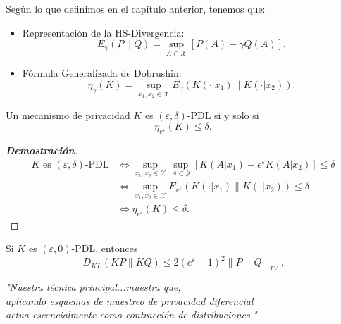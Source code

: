 \begin{observation}\cite{asoodeh2020contraction} Seg\'un lo que definimos en el cap\'itulo anterior, tenemos que:
\begin{itemize}
    \item Representaci\'on de la HS-Divergencia:
    \begin{equation*}
        E_\gamma(P\|Q)=\sup_{A\subset\mathcal{X}}[P(A)-\gamma Q(A)].
    \end{equation*}
    \item F\'ormula Generalizada de Dobrushin:
    \begin{equation*}
        \eta_\gamma(K)=\sup_{x_1,x_2\in\mathcal{X}}E_\gamma(K(\cdot|x_1)\|K(\cdot|x_2)).
    \end{equation*}
\end{itemize}
\end{observation}

\begin{theorem}\cite{asoodeh2020contraction}
Un mecanismo de privacidad $K$ es $(\varepsilon,\delta)$-PDL si y solo si
\begin{equation*}
    \eta_{e^{\varepsilon}}(K)\leq\delta.
\end{equation*}
\end{theorem}
\begin{proof}[\textbf{Demostraci\'on}]
\begin{align*}
    \text{$K$ es $(\varepsilon,\delta)$-PDL}&\iff\sup_{x_1,x_2\in\mathcal{X}}\sup_{A\subset\mathcal{Y}}\left[K(A|x_1)-e^\varepsilon K(A|x_2)\right]\leq\delta\\
    &\iff\sup_{x_1,x_2\in\mathcal{X}}E_{e^\varepsilon}(K(\cdot|x_1)\|K(\cdot|x_2))\leq\delta\\
    &\iff\eta_{e^\varepsilon}(K)\leq\delta.
\end{align*}
\end{proof}

\begin{theorem}\cite{asoodeh2020contraction}
Si $K$ es $(\varepsilon,0)$-PDL, entonces
\begin{equation*}
    D_{KL}(KP\|KQ)\leq2(e^\varepsilon-1)^2\|P-Q\|_{TV}.
\end{equation*}
\end{theorem}

\begin{center}
    \textit{"Nuestra t\'ecnica principal...muestra que,\\ aplicando esquemas de muestreo de privacidad diferencial\\
    actua escencialmente como contracci\'on de distribuciones."}
\end{center}

